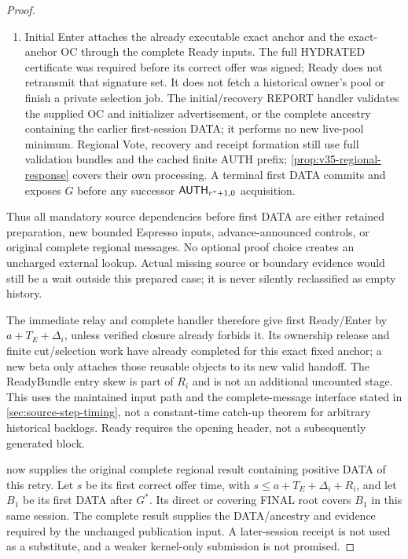 \begin{proof}
\begin{enumerate}[label=(\roman*),itemsep=2pt]
$G^*$ and supplied hash-linked path, quota and source position. All
required Espresso references are retained and checked for strict
precedence. No current-pair DATA transaction imports native state or
runs the separate $C_{\rm pub}$ execution/DA publication operation.
Those interfaces remain sound and separate.
\item Initial Enter attaches the already executable exact anchor and
the exact-anchor OC through the complete Ready inputs. The full
HYDRATED certificate was required before its correct offer was signed;
Ready does not retransmit that signature set. It does not fetch a
historical owner's pool or
finish a private selection job. The initial/recovery REPORT handler
validates the supplied OC and initializer advertisement, or the complete
ancestry containing the earlier first-session DATA; it performs no new
live-pool minimum. Regional Vote, recovery and receipt formation still
use full validation bundles and the cached finite AUTH prefix;
\cref{prop:v35-regional-response} covers their own processing. A terminal
first DATA commits and exposes $G$ before any successor
$\mathsf{AUTH}_{r^*+1,0}$ acquisition.
\end{enumerate}
Thus all mandatory source dependencies before first DATA are either
retained preparation, new bounded Espresso inputs, advance-announced
controls, or original complete regional messages. No optional proof
choice creates an uncharged external lookup. Actual missing source or
boundary evidence would still be a wait outside this prepared case;
it is never silently reclassified as empty history.

The immediate  relay and complete handler therefore
give first Ready/Enter by $a+T_E+\Delta_i$, unless verified closure
already forbids it. Its ownership release and finite cut/selection work
have already completed for this exact fixed anchor; a new beta only
attaches those reusable objects to its new valid handoff. The ReadyBundle entry skew is part of $R_i$ and is
not an additional uncounted stage. This uses the maintained input path
and the complete-message interface stated in
\cref{sec:source-step-timing}, not a constant-time catch-up theorem for
arbitrary historical backlogs. Ready requires the opening header, not
a subsequently generated block.

 now supplies the original complete
regional result containing positive DATA of this retry. Let $s$ be its
first correct offer time, with
$s\le a+T_E+\Delta_i+R_i$, and let $B_1$ be its first DATA after $G^*$.
Its direct or covering FINAL root covers $B_1$ in this same session.
The complete result supplies the DATA/ancestry and evidence required by
the unchanged publication input. A later-session receipt is not used
as a substitute, and a weaker kernel-only submission is not promised.


\end{proof}
